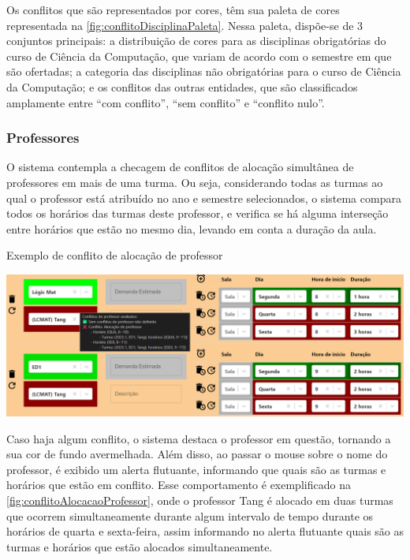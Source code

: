 Os conflitos que são representados por cores, têm sua paleta de cores representada na \autoref{fig:conflitoDisciplinaPaleta}. Nessa paleta, dispõe-se de 3 conjuntos principais: a distribuição de cores para as disciplinas obrigatórias do curso de Ciência da Computação, que variam de acordo com o semestre em que são ofertadas; a categoria das disciplinas não obrigatórias para o curso de Ciência da Computação; e os conflitos das outras entidades, que são classificados amplamente entre ``com conflito'', ``sem conflito'' e ``conflito nulo''.

\subsubsection{Professores}

O sistema contempla a checagem de conflitos de alocação simultânea de professores em mais de uma turma. Ou seja, considerando todas as turmas ao qual o professor está atribuído no ano e semestre selecionados, o sistema compara todos os horários das turmas deste professor, e verifica se há alguma interseção entre horários que estão no mesmo dia, levando em conta a duração da aula.

\begin{MyCenteredFigure}
  \caption{Exemplo de conflito de alocação de professor}
  \label{fig:conflitoAlocacaoProfessor}
  \includegraphics[width=\textwidth]{files/img/2.02!5-desenvolvimento/2.02!5.1.5-conflitos/Alocação de professores}
\end{MyCenteredFigure}

Caso haja algum conflito, o sistema destaca o professor em questão, tornando a sua cor de fundo avermelhada. Além disso, ao passar o mouse sobre o nome do professor, é exibido um alerta flutuante, informando que quais são as turmas e horários que estão em conflito. Esse comportamento é exemplificado na \autoref{fig:conflitoAlocacaoProfessor}, onde o professor Tang é alocado em duas turmas que ocorrem simultaneamente durante algum intervalo de tempo durante os horários de quarta e sexta-feira, assim informando no alerta flutuante quais são as turmas e horários que estão alocados simultaneamente.

